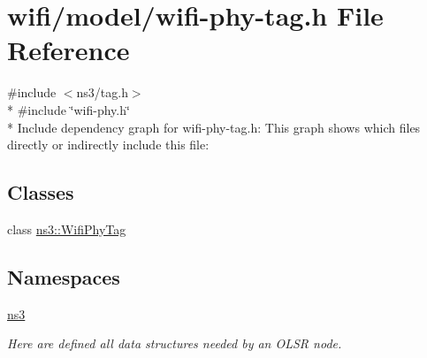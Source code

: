 \hypertarget{wifi-phy-tag_8h}{}\section{wifi/model/wifi-\/phy-\/tag.h File Reference}
\label{wifi-phy-tag_8h}
{\ttfamily \#include $<$ns3/tag.\+h$>$}\\*
{\ttfamily \#include \char`\"{}wifi-\/phy.\+h\char`\"{}}\\*
Include dependency graph for wifi-\/phy-\/tag.h\+:
This graph shows which files directly or indirectly include this file\+:
\subsection*{Classes}
\begin{DoxyCompactItemize}
\item 
class \hyperlink{classns3_1_1WifiPhyTag}{ns3\+::\+Wifi\+Phy\+Tag}
\end{DoxyCompactItemize}
\subsection*{Namespaces}
\begin{DoxyCompactItemize}
\item 
 \hyperlink{namespacens3}{ns3}
\begin{DoxyCompactList}\small\item\em Here are defined all data structures needed by an O\+L\+SR node. \end{DoxyCompactList}\end{DoxyCompactItemize}

